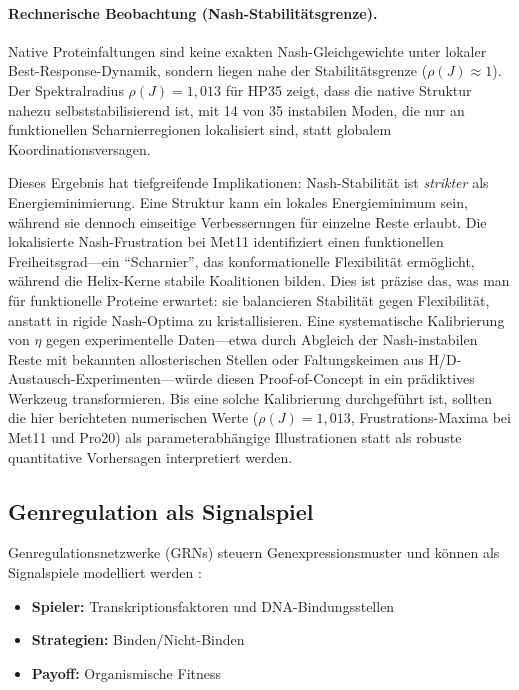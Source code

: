 \documentclass[12pt,a4paper]{article}
\theoremstyle{remark}
\begin{document}
\paragraph{Rechnerische Beobachtung (Nash-Stabilit\"atsgrenze).}
Native Proteinfaltungen sind keine exakten Nash-Gleichgewichte unter lokaler Best-Response-Dynamik, sondern liegen nahe der Stabilit\"atsgrenze ($\rho(J) \approx 1$). Der Spektralradius $\rho(J) = 1{,}013$ f\"ur HP35 zeigt, dass die native Struktur nahezu selbststabilisierend ist, mit 14 von 35 instabilen Moden, die nur an funktionellen Scharnierregionen lokalisiert sind, statt globalem Koordinationsversagen.

Dieses Ergebnis hat tiefgreifende Implikationen: Nash-Stabilit\"at ist \textit{strikter} als Energieminimierung. Eine Struktur kann ein lokales Energieminimum sein, w\"ahrend sie dennoch einseitige Verbesserungen f\"ur einzelne Reste erlaubt. Die lokalisierte Nash-Frustration bei Met11 identifiziert einen funktionellen Freiheitsgrad---ein ``Scharnier'', das konformationelle Flexibilit\"at erm\"oglicht, w\"ahrend die Helix-Kerne stabile Koalitionen bilden. Dies ist pr\"azise das, was man f\"ur funktionelle Proteine erwartet: sie balancieren Stabilit\"at gegen Flexibilit\"at, anstatt in rigide Nash-Optima zu kristallisieren. Eine systematische Kalibrierung von $\eta$ gegen experimentelle Daten---etwa durch Abgleich der Nash-instabilen Reste mit bekannten allosterischen Stellen oder Faltungskeimen aus H/D-Austausch-Experimenten---w\"urde diesen Proof-of-Concept in ein pr\"adiktives Werkzeug transformieren. Bis eine solche Kalibrierung durchgef\"uhrt ist, sollten die hier berichteten numerischen Werte ($\rho(J) = 1{,}013$, Frustrations-Maxima bei Met11 und Pro20) als parameterabh\"angige Illustrationen statt als robuste quantitative Vorhersagen interpretiert werden.

\subsection{Genregulation als Signalspiel}

Genregulationsnetzwerke (GRNs) steuern Genexpressionsmuster und k\"onnen als Signalspiele modelliert werden \citep{PredatorPreyESS}:

\begin{itemize}
    \item \textbf{Spieler:} Transkriptionsfaktoren und DNA-Bindungsstellen
    \item \textbf{Strategien:} Binden/Nicht-Binden
    \item \textbf{Payoff:} Organismische Fitness
\end{itemize}
\end{document}
